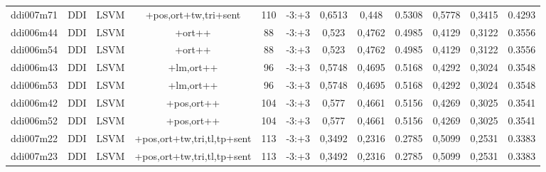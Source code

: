 \documentclass[a4paper]{article}
\begin{document}
\begin{landscape}
\begin{center}
\begin{tabular}{ |c|c|c|c|c|c|c|c|c|c|c|c|}
 
 	
 	\small{ ddi007m71 } & \small{ DDI} & \small{  LSVM }  & +pos,ort+tw,tri+sent  &  110 &  \small{  -3:+3 }  &  0,6513 & 0,448 & 0.5308  &  0,5778 & 0,3415 & 0.4293 \\
 	

 
 	
 	\small{ ddi006m44 } & \small{ DDI} & \small{  LSVM }  & +ort++  &  88 &  \small{  -3:+3 }  &  0,523 & 0,4762 & 0.4985  &  0,4129 & 0,3122 & 0.3556 \\
 	

 
 	
 	\small{ ddi006m54 } & \small{ DDI} & \small{  LSVM }  & +ort++  &  88 &  \small{  -3:+3 }  &  0,523 & 0,4762 & 0.4985  &  0,4129 & 0,3122 & 0.3556 \\
 	

 
 	
 	\small{ ddi006m43 } & \small{ DDI} & \small{  LSVM }  & +lm,ort++  &  96 &  \small{  -3:+3 }  &  0,5748 & 0,4695 & 0.5168  &  0,4292 & 0,3024 & 0.3548 \\
 	

 
 	
 	\small{ ddi006m53 } & \small{ DDI} & \small{  LSVM }  & +lm,ort++  &  96 &  \small{  -3:+3 }  &  0,5748 & 0,4695 & 0.5168  &  0,4292 & 0,3024 & 0.3548 \\
 	

 
 	
 	\small{ ddi006m42 } & \small{ DDI} & \small{  LSVM }  & +pos,ort++  &  104 &  \small{  -3:+3 }  &  0,577 & 0,4661 & 0.5156  &  0,4269 & 0,3025 & 0.3541 \\
 	

 
 	
 	\small{ ddi006m52 } & \small{ DDI} & \small{  LSVM }  & +pos,ort++  &  104 &  \small{  -3:+3 }  &  0,577 & 0,4661 & 0.5156  &  0,4269 & 0,3025 & 0.3541 \\
 	

 
 	
 	\small{ ddi007m22 } & \small{ DDI} & \small{  LSVM }  & +pos,ort+tw,tri,tl,tp+sent  &  113 &  \small{  -3:+3 }  &  0,3492 & 0,2316 & 0.2785  &  0,5099 & 0,2531 & 0.3383 \\
 	

 
 	
 	\small{ ddi007m23 } & \small{ DDI} & \small{  LSVM }  & +pos,ort+tw,tri,tl,tp+sent  &  113 &  \small{  -3:+3 }  &  0,3492 & 0,2316 & 0.2785  &  0,5099 & 0,2531 & 0.3383 \\
 	


\end{tabular}
\end{center}
\end{landscape}
\end{document}
